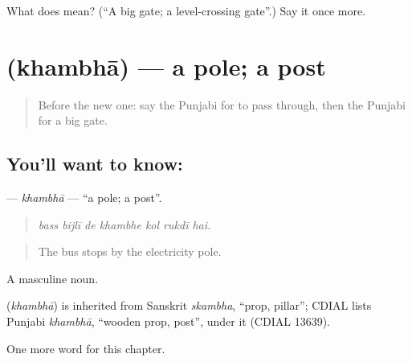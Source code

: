 \begin{tcolorbox}[breakable,colback=teal!4,colframe=teal!35!black,title={Before you move on}]
What does  mean? (\textquotedblleft{}A big gate; a level-crossing gate\textquotedblright{}.) Say it once more.
\end{tcolorbox}
\section[\texorpdfstring{\pa{ਖੰਭਾ} (khambhā)}{ਖੰਭਾ (khambhā)}]{ (khambhā) — a pole; a post}

\label{lesson:PA-C264-khambha}



\begin{quote}
Before the new one: say the Punjabi for to pass through, then the Punjabi for a big gate.
\end{quote}

\subsection*{You'll want to know: }
\textbf{} — \emph{khambhā} — \textquotedblleft{}a pole; a post\textquotedblright{}.

\begin{quote}
      
\end{quote}

\begin{quote}
\emph{bass bijlī de khambhe kol rukdī hai.}
\end{quote}

\begin{quote}
The bus stops by the electricity pole.
\end{quote}

A masculine noun.

\begin{cousinweb}
\textbf{} (\emph{khambhā}) is inherited from Sanskrit \emph{skambha}, \textquotedblleft{}prop, pillar\textquotedblright{}; CDIAL lists Punjabi \emph{khambhā}, \textquotedblleft{}wooden prop, post\textquotedblright{}, under it (CDIAL 13639).
\end{cousinweb}

\begin{grammarlens}[title={What you've built}]
One more word for this chapter.
\end{grammarlens}

